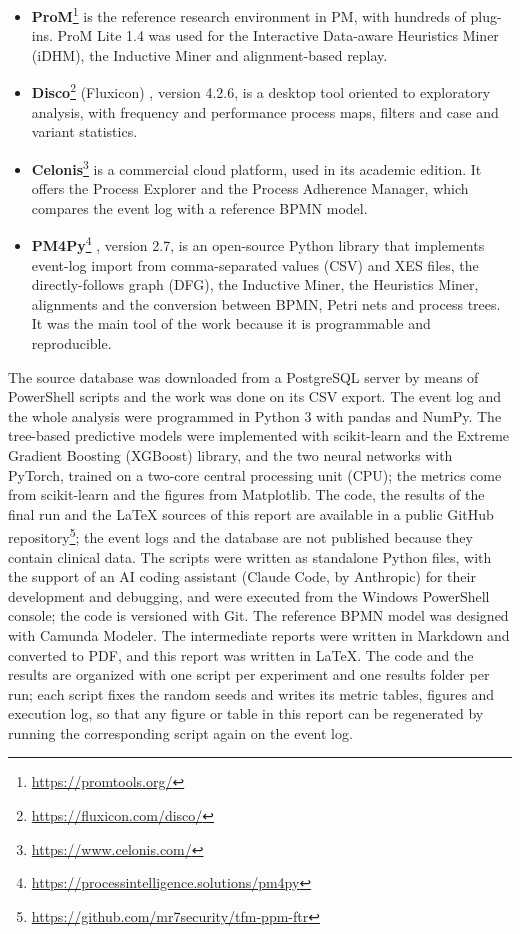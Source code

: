 \begin{itemize}[leftmargin=*]
  \item \textbf{ProM}\footnote{\url{https://promtools.org/}} \cite{verbeek2010} is the reference research environment in PM, with hundreds of plug-ins. ProM Lite 1.4 was used for the Interactive Data-aware Heuristics Miner (iDHM), the Inductive Miner and alignment-based replay.
  \item \textbf{Disco}\footnote{\url{https://fluxicon.com/disco/}} (Fluxicon) \cite{gunther2012}, version 4.2.6, is a desktop tool oriented to exploratory analysis, with frequency and performance process maps, filters and case and variant statistics.
  \item \textbf{Celonis}\footnote{\url{https://www.celonis.com/}} is a commercial cloud platform, used in its academic edition. It offers the Process Explorer and the Process Adherence Manager, which compares the event log with a reference BPMN model.
  \item \textbf{PM4Py}\footnote{\url{https://processintelligence.solutions/pm4py}} \cite{berti2019}, version 2.7, is an open-source Python library that implements event-log import from comma-separated values (CSV) and XES files, the directly-follows graph (DFG), the Inductive Miner, the Heuristics Miner, alignments and the conversion between BPMN, Petri nets and process trees. It was the main tool of the work because it is programmable and reproducible.
\end{itemize}

The source database was downloaded from a PostgreSQL server by means of PowerShell scripts and the work was done on its CSV export. The event log and the whole analysis were programmed in Python 3 with pandas and NumPy. The tree-based predictive models were implemented with scikit-learn and the Extreme Gradient Boosting (XGBoost) library, and the two neural networks with PyTorch, trained on a two-core central processing unit (CPU); the metrics come from scikit-learn and the figures from Matplotlib. The code, the results of the final run and the LaTeX sources of this report are available in a public GitHub repository\footnote{\url{https://github.com/mr7security/tfm-ppm-ftr}}; the event logs and the database are not published because they contain clinical data. The scripts were written as standalone Python files, with the support of an AI coding assistant (Claude Code, by Anthropic) for their development and debugging, and were executed from the Windows PowerShell console; the code is versioned with Git. The reference BPMN model was designed with Camunda Modeler. The intermediate reports were written in Markdown and converted to PDF, and this report was written in \LaTeX. The code and the results are organized with one script per experiment and one results folder per run; each script fixes the random seeds and writes its metric tables, figures and execution log, so that any figure or table in this report can be regenerated by running the corresponding script again on the event log.

